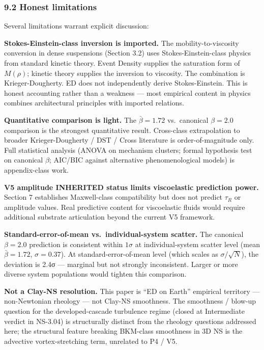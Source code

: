 \documentclass[
  11pt,a4paper]{article}
\begin{document}
\subsubsection{9.2 Honest limitations}\label{honest-limitations}

Several limitations warrant explicit discussion:

\textbf{Stokes-Einstein-class inversion is imported.} The
mobility-to-viscosity conversion in dense suspensions (Section 3.2) uses
Stokes-Einstein-class physics from standard kinetic theory. Event
Density supplies the saturation form of \(M(\rho)\); kinetic theory
supplies the inversion to viscosity. The combination is
Krieger-Dougherty. ED does not independently derive Stokes-Einstein.
This is honest accounting rather than a weakness --- most empirical
content in physics combines architectural principles with imported
relations.

\textbf{Quantitative comparison is light.} The \(\bar\beta = 1.72\)
vs.~canonical \(\beta = 2.0\) comparison is the strongest quantitative
result. Cross-class extrapolation to broader Krieger-Dougherty / DST /
Cross literature is order-of-magnitude only. Full statistical analysis
(ANOVA on mechanism clusters; formal hypothesis test on canonical
\(\beta\); AIC/BIC against alternative phenomenological models) is
appendix-class work.

\textbf{V5 amplitude INHERITED status limits viscoelastic prediction
power.} Section 7 establishes Maxwell-class compatibility but does not
predict \(\tau_R\) or amplitude values. Real predictive content for
viscoelastic fluids would require additional substrate articulation
beyond the current V5 framework.

\textbf{Standard-error-of-mean vs.~individual-system scatter.} The
canonical \(\beta = 2.0\) prediction is consistent within \(1\sigma\) at
individual-system scatter level (mean \(\bar\beta = 1.72\),
\(\sigma = 0.37\)). At standard-error-of-mean level (which scales as
\(\sigma/\sqrt{N}\)), the deviation is 2.4σ --- marginal but not
strongly inconsistent. Larger or more diverse system populations would
tighten this comparison.

\textbf{Not a Clay-NS resolution.} This paper is ``ED on Earth''
empirical territory --- non-Newtonian rheology --- not Clay-NS
smoothness. The smoothness / blow-up question for the developed-cascade
turbulence regime (closed at Intermediate verdict in NS-3.04) is
structurally distinct from the rheology questions addressed here; the
structural feature breaking BKM-class smoothness in 3D NS is the
advective vortex-stretching term, unrelated to P4 / V5.
\end{document}
